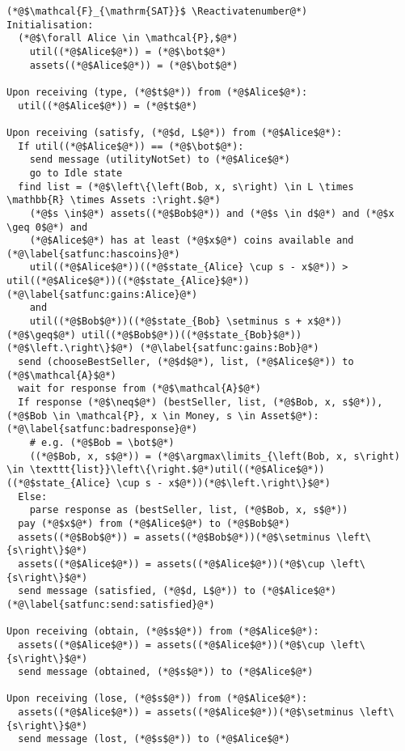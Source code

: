 \Suppressnumber
\begin{lstlisting}[label=satfunc, style=numbers]
(*@$\mathcal{F}_{\mathrm{SAT}}$ \Reactivatenumber@*)
Initialisation:
  (*@$\forall Alice \in \mathcal{P},$@*)
    util((*@$Alice$@*)) = (*@$\bot$@*)
    assets((*@$Alice$@*)) = (*@$\bot$@*)

Upon receiving (type, (*@$t$@*)) from (*@$Alice$@*):
  util((*@$Alice$@*)) = (*@$t$@*)

Upon receiving (satisfy, (*@$d, L$@*)) from (*@$Alice$@*):
  If util((*@$Alice$@*)) == (*@$\bot$@*):
    send message (utilityNotSet) to (*@$Alice$@*)
    go to Idle state
  find list = (*@$\left\{\left(Bob, x, s\right) \in L \times \mathbb{R} \times Assets :\right.$@*)
    (*@$s \in$@*) assets((*@$Bob$@*)) and (*@$s \in d$@*) and (*@$x \geq 0$@*) and
    (*@$Alice$@*) has at least (*@$x$@*) coins available and (*@\label{satfunc:hascoins}@*)
    util((*@$Alice$@*))((*@$state_{Alice} \cup s - x$@*)) > util((*@$Alice$@*))((*@$state_{Alice}$@*)) (*@\label{satfunc:gains:Alice}@*)
    and
    util((*@$Bob$@*))((*@$state_{Bob} \setminus s + x$@*)) (*@$\geq$@*) util((*@$Bob$@*))((*@$state_{Bob}$@*))(*@$\left.\right\}$@*) (*@\label{satfunc:gains:Bob}@*)
  send (chooseBestSeller, (*@$d$@*), list, (*@$Alice$@*)) to (*@$\mathcal{A}$@*)
  wait for response from (*@$\mathcal{A}$@*)
  If response (*@$\neq$@*) (bestSeller, list, (*@$Bob, x, s$@*)), (*@$Bob \in \mathcal{P}, x \in Money, s \in Asset$@*): (*@\label{satfunc:badresponse}@*)
    # e.g. (*@$Bob = \bot$@*)
    ((*@$Bob, x, s$@*)) = (*@$\argmax\limits_{\left(Bob, x, s\right) \in \texttt{list}}\left\{\right.$@*)util((*@$Alice$@*))((*@$state_{Alice} \cup s - x$@*))(*@$\left.\right\}$@*)
  Else:
    parse response as (bestSeller, list, (*@$Bob, x, s$@*))
  pay (*@$x$@*) from (*@$Alice$@*) to (*@$Bob$@*)
  assets((*@$Bob$@*)) = assets((*@$Bob$@*))(*@$\setminus \left\{s\right\}$@*)
  assets((*@$Alice$@*)) = assets((*@$Alice$@*))(*@$\cup \left\{s\right\}$@*)
  send message (satisfied, (*@$d, L$@*)) to (*@$Alice$@*) (*@\label{satfunc:send:satisfied}@*)

Upon receiving (obtain, (*@$s$@*)) from (*@$Alice$@*):
  assets((*@$Alice$@*)) = assets((*@$Alice$@*))(*@$\cup \left\{s\right\}$@*)
  send message (obtained, (*@$s$@*)) to (*@$Alice$@*)

Upon receiving (lose, (*@$s$@*)) from (*@$Alice$@*):
  assets((*@$Alice$@*)) = assets((*@$Alice$@*))(*@$\setminus \left\{s\right\}$@*)
  send message (lost, (*@$s$@*)) to (*@$Alice$@*)
\end{lstlisting}
